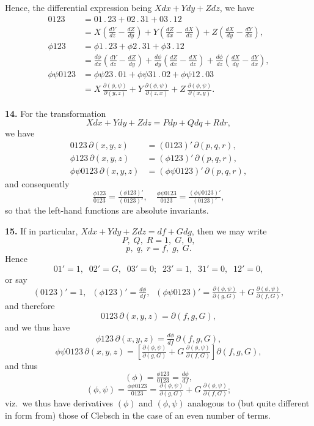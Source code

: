 \documentclass[11pt]{article}
\begin{document}
Hence, the differential expression being $Xdx + Ydy + Zdz$, we have
\begin{align*}
0123 &= 01\,.\,23 + 02\,.\,31 + 03\,.\,12\\
&= X\!\left(\tfrac{dY}{dz} - \tfrac{dZ}{dy}\right) + Y\!\left(\tfrac{dZ}{dx} - \tfrac{dX}{dz}\right) + Z\!\left(\tfrac{dX}{dy} - \tfrac{dY}{dx}\right),\\[4pt]
\phi 123 &= \phi 1\,.\,23 + \phi 2\,.\,31 + \phi 3\,.\,12\\
&= \tfrac{d\phi}{dx}\!\left(\tfrac{dY}{dz} - \tfrac{dZ}{dy}\right) + \tfrac{d\phi}{dy}\!\left(\tfrac{dZ}{dx} - \tfrac{dX}{dz}\right) + \tfrac{d\phi}{dz}\!\left(\tfrac{dX}{dy} - \tfrac{dY}{dx}\right),\\[4pt]
\phi\psi 0123 &= \phi\psi 23\,.\,01 + \phi\psi 31\,.\,02 + \phi\psi 12\,.\,03\\
&= X\,\tfrac{\partial(\phi,\psi)}{\partial(y,z)} + Y\,\tfrac{\partial(\phi,\psi)}{\partial(z,x)} + Z\,\tfrac{\partial(\phi,\psi)}{\partial(x,y)}.
\end{align*}

\medskip
\textbf{14.} For the transformation
\[ Xdx + Ydy + Zdz = Pdp + Qdq + Rdr, \]
we have
\begin{align*}
0123\,\partial(x,y,z) &= (0123)'\,\partial(p,q,r),\\
\phi 123\,\partial(x,y,z) &= (\phi 123)'\,\partial(p,q,r),\\
\phi\psi 0123\,\partial(x,y,z) &= (\phi\psi 0123)'\,\partial(p,q,r),
\end{align*}
and consequently
\[ \tfrac{\phi 123}{0123} = \tfrac{(\phi 123)'}{(0123)'},\quad \tfrac{\phi\psi 0123}{0123} = \tfrac{(\phi\psi 0123)'}{(0123)'}, \]
so that the left-hand functions are absolute invariants.

\medskip
\textbf{15.} If in particular, $Xdx + Ydy + Zdz = df + Gdg$, then we may write
\[ P,\;Q,\;R = 1,\;G,\;0, \]
\[ p,\;q,\;r = f,\;g,\;G. \]
Hence
\[ 01' = 1,\;\; 02' = G,\;\; 03' = 0;\;\; 23' = 1,\;\; 31' = 0,\;\; 12' = 0, \]
or say
\[ (0123)' = 1,\;\; (\phi 123)' = \tfrac{d\phi}{df},\;\; (\phi\psi 0123)' = \tfrac{\partial(\phi,\psi)}{\partial(g,G)} + G\,\tfrac{\partial(\phi,\psi)}{\partial(f,G)}, \]
and therefore
\[ 0123\,\partial(x,y,z) = \partial(f,g,G), \]
and we thus have
\[ \phi 123\,\partial(x,y,z) = \tfrac{d\phi}{df}\,\partial(f,g,G), \]
\[ \phi\psi 0123\,\partial(x,y,z) = \left[\tfrac{\partial(\phi,\psi)}{\partial(g,G)} + G\,\tfrac{\partial(\phi,\psi)}{\partial(f,G)}\right]\partial(f,g,G), \]
and thus
\[ (\phi) = \tfrac{\phi 123}{0123} = \tfrac{d\phi}{df}, \]
\[ (\phi,\psi) = \tfrac{\phi\psi 0123}{0123} = \tfrac{\partial(\phi,\psi)}{\partial(g,G)} + G\,\tfrac{\partial(\phi,\psi)}{\partial(f,G)}; \]
viz.\ we thus have derivatives $(\phi)$ and $(\phi,\psi)$ analogous to (but quite different in form from) those of Clebsch in the case of an even number of terms.
\end{document}

